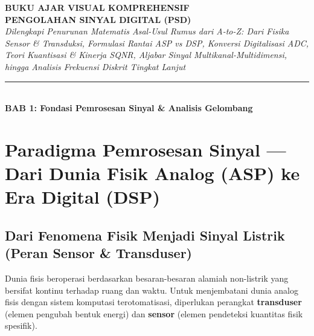 \documentclass[11pt,a4paper]{article}
\begin{document}
\begin{center}
  \vspace*{0.3cm}
  {\huge\bfseries\sffamily\color{primary} BUKU AJAR VISUAL KOMPREHENSIF}\\[0.3cm]
  {\LARGE\bfseries\sffamily\color{secondary} PENGOLAHAN SINYAL DIGITAL (PSD)}\\[0.4cm]
  {\large\itshape Dilengkapi Penurunan Matematis Asal-Usul Rumus dari A-to-Z: Dari Fisika Sensor \& Transduksi, Formulasi Rantai ASP vs DSP, Konversi Digitalisasi ADC, Teori Kuantisasi \& Kinerja SQNR, Aljabar Sinyal Multikanal-Multidimensi, hingga Analisis Frekuensi Diskrit Tingkat Lanjut}\\[0.4cm]
  \rule{\textwidth}{1.5pt}\\[0.3cm]
  {\Large\bfseries\sffamily\color{primary} BAB 1: Fondasi Pemrosesan Sinyal \& Analisis Gelombang}
  \vspace*{0.3cm}
\end{center}

\begin{tcolorbox}[colback=white, colframe=primary!30, arc=2mm, boxrule=0.8pt]
\tableofcontents
\end{tcolorbox}

\vspace{0.5cm}
\newpage

\section{Paradigma Pemrosesan Sinyal — Dari Dunia Fisik Analog (ASP) ke Era Digital (DSP)}

\subsection{Dari Fenomena Fisik Menjadi Sinyal Listrik (Peran Sensor \& Transduser)}

Dunia fisis beroperasi berdasarkan besaran-besaran alamiah non-listrik yang bersifat kontinu terhadap ruang dan waktu. Untuk menjembatani dunia analog fisis dengan sistem komputasi terotomatisasi, diperlukan perangkat \textbf{transduser} (elemen pengubah bentuk energi) dan \textbf{sensor} (elemen pendeteksi kuantitas fisik spesifik).
\end{document}
